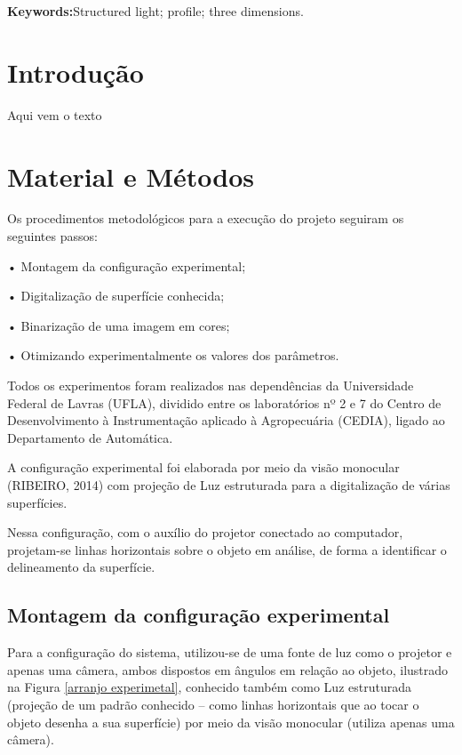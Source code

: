 \documentclass[a4paper, 12pt]{article}
\begin{document}
\textbf{Keywords:}Structured light; profile; three dimensions. 



\section{Introdução}

Aqui vem o texto



\section{Material e Métodos}

Os procedimentos metodológicos para a execução do projeto seguiram os seguintes passos:

• Montagem da configuração experimental;

• Digitalização de superfície conhecida;

• Binarização de uma imagem em cores;

• Otimizando experimentalmente os valores dos parâmetros. 

Todos os experimentos foram realizados nas dependências da Universidade Federal de Lavras (UFLA), dividido entre os laboratórios nº 2 e 7 do Centro de Desenvolvimento à Instrumentação aplicado à Agropecuária (CEDIA), ligado ao Departamento de Automática.

A configuração experimental foi elaborada por meio da visão monocular (RIBEIRO, 2014) com projeção de Luz estruturada para a digitalização de várias superfícies.

Nessa configuração, com o auxílio do projetor conectado ao computador, projetam-se linhas horizontais sobre o objeto em análise, de forma a identificar o delineamento da superfície.


\subsection{Montagem da configuração experimental}

Para a configuração do sistema, utilizou-se de uma fonte de luz como o projetor e apenas uma câmera, ambos dispostos em ângulos em relação ao objeto, ilustrado na Figura \ref{arranjo experimetal}, conhecido também como Luz estruturada (projeção de um padrão conhecido – como linhas horizontais que ao tocar o objeto desenha a sua superfície) por meio da visão monocular (utiliza apenas uma câmera).
\end{document}
